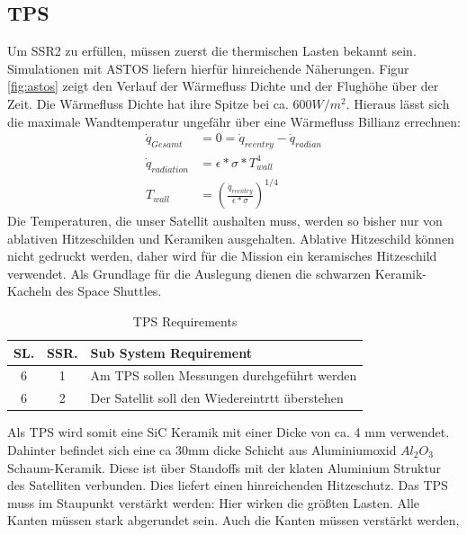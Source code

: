 \documentclass[twoside]{article}
\begin{document}
\begin{multicols}{2}
      \subsection{TPS}
      Um SSR2 zu erfüllen, müssen zuerst die thermischen Lasten bekannt sein.
      Simulationen mit ASTOS liefern hierfür hinreichende Näherungen. Figur \ref{fig:astos}
      zeigt den Verlauf der Wärmefluss Dichte und der Flughöhe über der Zeit.
      Die Wärmefluss Dichte hat ihre Spitze bei ca. $600 W/m^2$. Hieraus lässt sich die 
      maximale Wandtemperatur ungefähr über eine Wärmefluss Billianz errechnen:
      \begin{align}
         \dot q_{Gesamt} &= 0 = \dot q_{reentry} - \dot q_{radian} \\
         \dot q_{radiation} &= \epsilon * \sigma * T_{wall}^4 \\
         T_{wall} &= (\frac{\dot q_{reentry}}{\epsilon*\sigma})^{1/4} 
      \end{align}
      Die Temperaturen, die unser Satellit aushalten muss, werden so bisher nur von
      ablativen Hitzeschilden und Keramiken ausgehalten. Ablative Hitzeschild können
      nicht gedruckt werden, daher wird für die Mission ein keramisches Hitzeschild
      verwendet. Als Grundlage für die Auslegung dienen die schwarzen Keramik-Kacheln
      des Space Shuttles. 
      \begin{table}[H]
         \centering
         \begin{tabular}{ccl}
            \toprule  
            SL. & SSR. & Sub System Requirement \\
            \midrule
            6 & 1 & \parbox[t]{5cm}{Am TPS sollen Messungen durchgeführt werden}  \\
            6 & 2 & \parbox[t]{5cm}{Der Satellit soll den Wiedereintrtt überstehen}  \\
            \bottomrule
         \end{tabular}
         \caption{TPS Requirements}
         \label{tab:tpsreq}
      \end{table}
      Als TPS wird somit eine SiC Keramik mit einer Dicke von ca. 4 mm verwendet.
      Dahinter befindet sich eine ca 30mm dicke Schicht aus Aluminiumoxid 
      $Al_2O_3$ Schaum-Keramik. Diese ist über Standoffs mit der klaten Aluminium Struktur
      des Satelliten verbunden. Dies liefert einen hinreichenden Hitzeschutz.
      Das TPS muss im Staupunkt verstärkt werden: Hier wirken die größten Lasten.
      Alle Kanten müssen stark abgerundet sein. Auch die Kanten müssen verstärkt werden,

\end{multicols}
\end{document}
